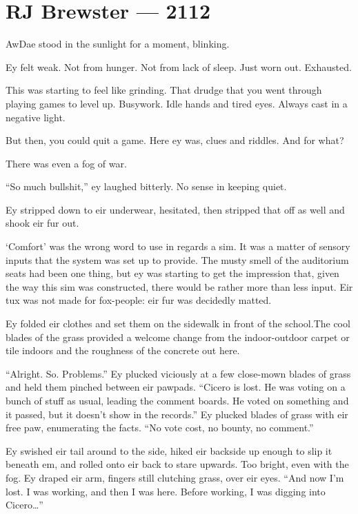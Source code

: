 \hypertarget{rj-brewster-2112}{%
\chapter*{RJ Brewster — 2112}\label{rj-brewster-2112}}

AwDae stood in the sunlight for a moment, blinking.

Ey felt weak. Not from hunger. Not from lack of sleep. Just worn out. Exhausted.

This was starting to feel like grinding. That drudge that you went through playing games to level up. Busywork. Idle hands and tired eyes. Always cast in a negative light.

But then, you could quit a game. Here ey was, clues and riddles. And for what?

There was even a fog of war.

``So much bullshit,'' ey laughed bitterly. No sense in keeping quiet.

Ey stripped down to eir underwear, hesitated, then stripped that off as well and shook eir fur out.

`Comfort' was the wrong word to use in regards a sim. It was a matter of sensory inputs that the system was set up to provide. The musty smell of the auditorium seats had been one thing, but ey was starting to get the impression that, given the way this sim was constructed, there would be rather more than less input. Eir tux was not made for fox-people: eir fur was decidedly matted.

Ey folded eir clothes and set them on the sidewalk in front of the school.The cool blades of the grass provided a welcome change from the indoor-outdoor carpet or tile indoors and the roughness of the concrete out here.

``Alright. So. Problems.'' Ey plucked viciously at a few close-mown blades of grass and held them pinched between eir pawpads. ``Cicero is lost. He was voting on a bunch of stuff as usual, leading the comment boards. He voted on something and it passed, but it doesn't show in the records.'' Ey plucked blades of grass with eir free paw, enumerating the facts. ``No vote cost, no bounty, no comment.''

Ey swished eir tail around to the side, hiked eir backside up enough to slip it beneath em, and rolled onto eir back to stare upwards. Too bright, even with the fog. Ey draped eir arm, fingers still clutching grass, over eir eyes. ``And now I'm lost. I was working, and then I was here. Before working, I was digging into Cicero\ldots{}''

